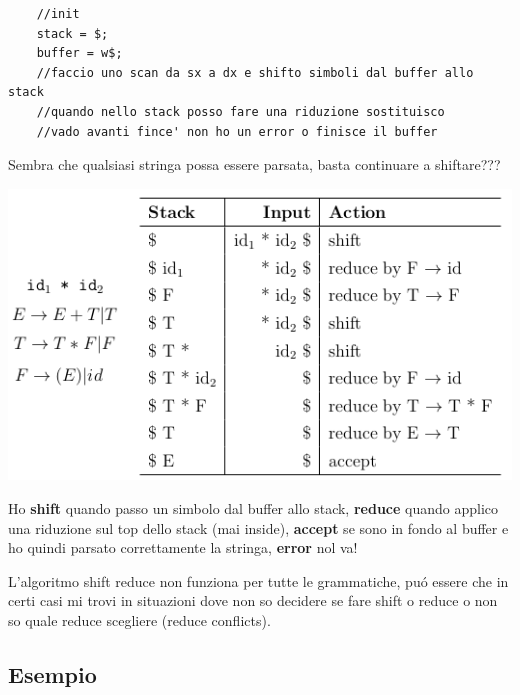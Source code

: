 \begin{lstlisting}
    //init
    stack = $;
    buffer = w$;
    //faccio uno scan da sx a dx e shifto simboli dal buffer allo stack 
    //quando nello stack posso fare una riduzione sostituisco
    //vado avanti fince' non ho un error o finisce il buffer
\end{lstlisting}
Sembra che qualsiasi stringa possa essere parsata, basta continuare a shiftare???

\begin{center}
    \includegraphics[scale=0.6]{Chapters/Img/c04_04.png}\\
\end{center}

Ho \textbf{shift} quando passo un simbolo dal buffer allo stack, \textbf{reduce} quando applico una riduzione sul top dello stack 
(mai inside), \textbf{accept} se sono in fondo al buffer e ho quindi parsato correttamente la stringa, \textbf{error} nol va!

L'algoritmo shift reduce non funziona per tutte le grammatiche, pu\'o essere che in certi casi mi trovi in situazioni dove non 
so decidere se fare shift o reduce o non so quale reduce scegliere (reduce conflicts).

\subsection{Esempio}

